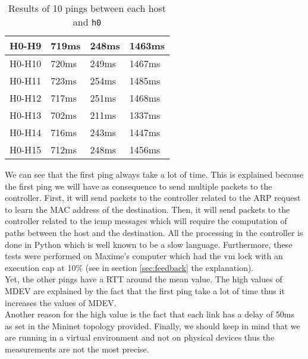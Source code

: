 \documentclass[a4paper, 11pt, oneside]{article}
\begin{document}
\begin{table}[H]
\begin{tabular}{|l|l|l|l|}
H0-H9                                      & 719ms                              & 248ms                              & 1463ms                                 \\ \hline
H0-H10                                     & 720ms                              & 249ms                              & 1467ms                                 \\ \hline
H0-H11                                     & 723ms                              & 254ms                              & 1485ms                                 \\ \hline
H0-H12                                     & 717ms                              & 251ms                              & 1468ms                                 \\ \hline
H0-H13                                     & 702ms                              & 211ms                              & 1337ms                                 \\ \hline
H0-H14                                     & 716ms                              & 243ms                              & 1447ms                                 \\ \hline
H0-H15                                     & 712ms                              & 248ms                              & 1456ms                                 \\ \hline
\end{tabular}
\caption{Results of 10 pings between each host and \texttt{h0}}
\end{table}
We can see that the first ping always take a lot of time. This is explained because the first ping we will have as consequence to send multiple packets to the controller. First, it will send packets to the controller related to the ARP request to learn the MAC address of the destination. Then, it will send packets to the controller related to the icmp messages which will require the computation of paths between the host and the destination. All the processing in the controller is done in Python which is well known to be a slow language. Furthermore, these tests were performed on Maxime's computer which had the vm lock with an execution cap at 10\% (see in section \ref{sec:feedback} the explanation).\\
Yet, the other pings have a RTT around the mean value. The high values of MDEV are explained by the fact that the first ping take a lot of time thus it increases the values of MDEV.\\
Another reason for the high value is the fact that each link has a delay of 50ms as set in the Mininet topology provided. Finally, we should keep in mind that we are running in a virtual environment and not on physical devices thus the measurements are not the most precise.
\end{document}
